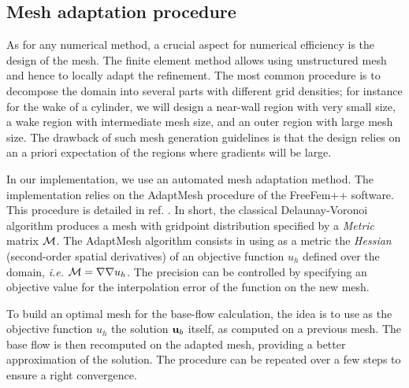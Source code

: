 \documentclass[twocolumn,10pt]{asme2ej}
\begin{document}
\subsection{Mesh adaptation procedure}
\vspace{.2cm}

As for any numerical method, a crucial aspect for numerical efficiency is the design of the mesh. The finite element method allows using unstructured mesh and hence to locally adapt the refinement. %
The most common procedure is to decompose the domain into several parts with different grid densities; for instance for the wake of a cylinder, we will design a near-wall region with very small  size, a wake region with intermediate mesh size, and an outer region with large mesh size. The drawback of such mesh generation guidelines is that the design relies on an a priori expectation of the regions where gradients will be large. 

In our implementation, we use an automated mesh adaptation method. %
The implementation relies on the AdaptMesh procedure of the FreeFem++ software. This procedure is detailed in ref. \cite{adapt}. 
In short, the classical Delaunay-Voronoi algorithm produces a mesh with gridpoint distribution specified by a {\em Metric } matrix $\cal M$. The AdaptMesh algorithm consists in using as a metric the {\em Hessian} (second-order spatial derivatives) of an objective function $u_h$ defined over the domain, \textit{i.e.} ${\cal M} = \nabla \nabla u_h$. The precision can be controlled by specifying an objective value for the interpolation error of the function on the new mesh.

To build an optimal mesh for the base-flow calculation, the idea is to use as the objective function $u_h$ the solution ${\bf u}_b$ itself, as computed on a previous mesh. %
The base flow is then recomputed on the adapted mesh, providing a better approximation of the solution. The procedure can be repeated over a few steps to ensure a right convergence.
\end{document}
